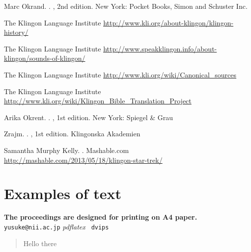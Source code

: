 \documentclass[11pt]{article}
\begin{document}
\begin{thebibliography}{}

Marc Okrand.
.
, 2nd edition.
\newblock New York: Pocket Books, Simon and Schuster Inc.

\newblock The Klingon Language Institute
\newblock \url{http://www.kli.org/about-klingon/klingon-history/}

\newblock The Klingon Language Institute
\newblock \url{http://www.speakklingon.info/about-klingon/sounds-of-klingon/}

\newblock The Klingon Language Institute
\newblock \url{http://www.kli.org/wiki/Canonical_sources}

\newblock The Klingon Language Institute
\newblock \url{http://www.kli.org/wiki/Klingon_Bible_Translation_Project}

Arika Okrent.
.
, 1st edition.
\newblock New York: Spiegel \& Grau

Zrajm.
.
, 1st edition.
\newblock Klingonska Akademien

Samantha Murphy Kelly.
.
\newblock Mashable.com
\newblock \url{http://mashable.com/2013/05/18/klingon-star-trek/}

\end{thebibliography}

\section{Examples of text}

\textbf{The proceedings are designed for printing on A4
  paper.}
\texttt{yusuke@nii.ac.jp}
\textit{pdflatex}
\texttt{ dvips}

\begin{quote}
Hello there
\end{quote}
\end{document}
